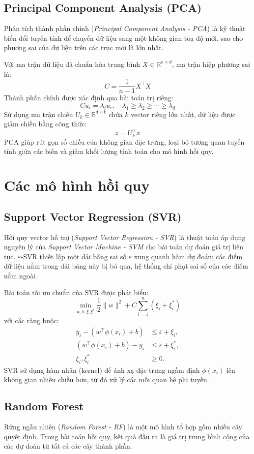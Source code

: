 \subsection{Principal Component Analysis (PCA)}
Phân tích thành phần chính (\textit{Principal Component Analysis - PCA}) \cite{Jolliffe2002PCA} là kỹ thuật biến đổi tuyến tính để chuyển dữ liệu sang một không gian toạ độ mới, sao cho phương sai của dữ liệu trên các trục mới là lớn nhất.

Với ma trận dữ liệu đã chuẩn hóa trung bình $X \in \mathbb{R}^{n\times d}$, ma trận hiệp phương sai là:
\[
C = \frac{1}{n-1}X^\top X
\]
Thành phần chính được xác định qua bài toán trị riêng:
\[
Cu_i = \lambda_i u_i, \quad \lambda_1 \ge \lambda_2 \ge \cdots \ge \lambda_d
\]
Sử dụng ma trận chiếu $U_k \in \mathbb{R}^{d\times k}$ chứa $k$ vector riêng lớn nhất, dữ liệu được giảm chiều bằng công thức:
\[
z = U_k^\top x
\]
PCA giúp rút gọn số chiều của không gian đặc trưng, loại bỏ tương quan tuyến tính giữa các biến và giảm khối lượng tính toán cho mô hình hồi quy.

\section{Các mô hình hồi quy}
\subsection{Support Vector Regression (SVR)}
Hồi quy vector hỗ trợ (\textit{Support Vector Regression - SVR}) \cite{Drucker1997SVR} là thuật toán áp dụng nguyên lý của \textit{Support Vector Machine - SVM} cho bài toán dự đoán giá trị liên tục. $\varepsilon$-SVR thiết lập một dải băng sai số $\varepsilon$ xung quanh hàm dự đoán; các điểm dữ liệu nằm trong dải băng này bị bỏ qua, hệ thống chỉ phạt sai số của các điểm nằm ngoài.

Bài toán tối ưu chuẩn của SVR được phát biểu:
\[
\min_{w,b,\xi,\xi^*} \frac{1}{2}\lVert w\rVert^2 + C\sum_{i=1}^{n}(\xi_i+\xi_i^*)
\]
với các ràng buộc:
\[
\begin{aligned}
y_i - (w^\top\phi(x_i)+b) &\le \varepsilon + \xi_i,\\
(w^\top\phi(x_i)+b) - y_i &\le \varepsilon + \xi_i^*,\\
\xi_i,\xi_i^* &\ge 0.
\end{aligned}
\]
SVR sử dụng hàm nhân (kernel) để ánh xạ đặc trưng ngầm định $\phi(x_i)$ lên không gian nhiều chiều hơn, từ đó xử lý các mối quan hệ phi tuyến.

\subsection{Random Forest}
Rừng ngẫu nhiên (\textit{Random Forest - RF}) \cite{Breiman2001RF} là một mô hình tổ hợp gồm nhiều cây quyết định. Trong bài toán hồi quy, kết quả đầu ra là giá trị trung bình cộng của các dự đoán từ tất cả các cây thành phần.

